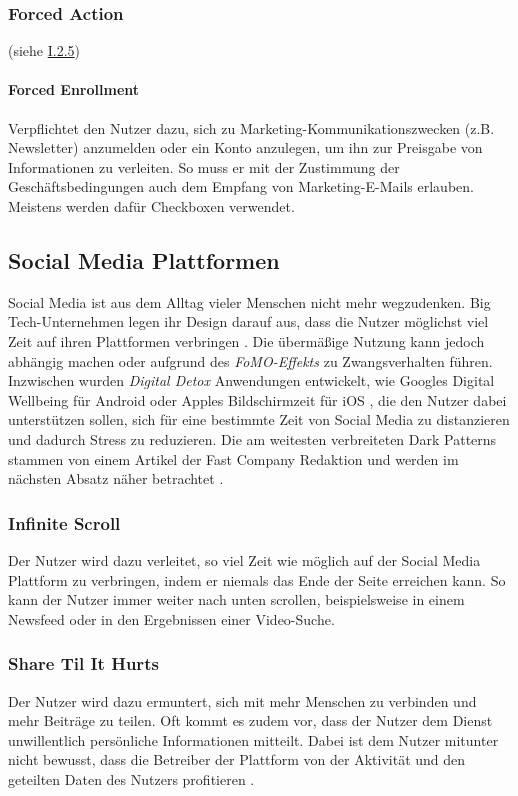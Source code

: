 \documentclass[a4paper]{article}
\begin{document}
\subsubsection{Forced Action}
\label{sssec:forced_action2}
(siehe \hyperref[sssec:forced_action]{I.2.5})

\paragraph{Forced Enrollment}
\label{para:forced_enrollment}
Verpflichtet den Nutzer dazu, sich zu Marketing-Kommunikationszwecken (z.B. Newsletter) anzumelden oder ein Konto anzulegen, um ihn zur Preisgabe von Informationen zu verleiten. So muss er mit der Zustimmung der Geschäftsbedingungen auch dem Empfang von Marketing-E-Mails erlauben. Meistens werden dafür Checkboxen verwendet.

\subsection{Social Media Plattformen}
\label{sub:soziale_netzwerke}
Social Media ist aus dem Alltag vieler Menschen nicht mehr wegzudenken. Big Tech-Unternehmen legen ihr Design darauf aus, dass die Nutzer möglichst viel Zeit auf ihren Plattformen verbringen \cite{the_social_dilemma}. Die übermäßige Nutzung kann jedoch abhängig machen oder aufgrund des \textit{FoMO-Effekts} zu Zwangsverhalten führen. Inzwischen wurden \textit{Digital Detox} Anwendungen entwickelt, wie Googles \glqq Digital Wellbeing\grqq{} für Android oder Apples \glqq Bildschirmzeit\grqq{} für iOS \cite{digital_detox}, die den Nutzer dabei unterstützen sollen, sich für eine bestimmte Zeit von Social Media zu distanzieren und dadurch Stress zu reduzieren. \newline
Die am weitesten verbreiteten Dark Patterns stammen von einem Artikel der Fast Company Redaktion und werden im nächsten Absatz näher betrachtet \cite{fastcompany}.

\subsubsection{Infinite Scroll}
Der Nutzer wird dazu verleitet, so viel Zeit wie möglich auf der Social Media Plattform zu verbringen, indem er niemals das Ende der Seite erreichen kann. So kann der Nutzer immer weiter nach unten scrollen, beispielsweise in einem Newsfeed oder in den Ergebnissen einer Video-Suche.

\subsubsection{Share Til It Hurts}
Der Nutzer wird dazu ermuntert, sich mit mehr Menschen zu verbinden und mehr Beiträge zu teilen. Oft kommt es zudem vor, dass der Nutzer dem Dienst unwillentlich persönliche Informationen mitteilt. Dabei ist dem Nutzer mitunter nicht bewusst, dass die Betreiber der Plattform von der Aktivität und den geteilten Daten des Nutzers profitieren \cite{bipartisan}. 
\end{document}
